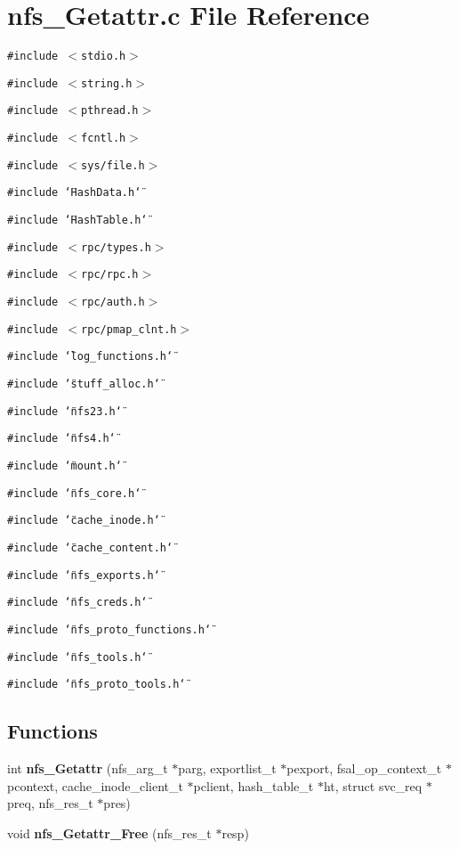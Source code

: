 \section{nfs\_\-Getattr.c File Reference}
\label{nfs__Getattr_8c}
{\tt \#include $<$stdio.h$>$}\par
{\tt \#include $<$string.h$>$}\par
{\tt \#include $<$pthread.h$>$}\par
{\tt \#include $<$fcntl.h$>$}\par
{\tt \#include $<$sys/file.h$>$}\par
{\tt \#include \char`\"{}Hash\-Data.h\char`\"{}}\par
{\tt \#include \char`\"{}Hash\-Table.h\char`\"{}}\par
{\tt \#include $<$rpc/types.h$>$}\par
{\tt \#include $<$rpc/rpc.h$>$}\par
{\tt \#include $<$rpc/auth.h$>$}\par
{\tt \#include $<$rpc/pmap\_\-clnt.h$>$}\par
{\tt \#include \char`\"{}log\_\-functions.h\char`\"{}}\par
{\tt \#include \char`\"{}stuff\_\-alloc.h\char`\"{}}\par
{\tt \#include \char`\"{}nfs23.h\char`\"{}}\par
{\tt \#include \char`\"{}nfs4.h\char`\"{}}\par
{\tt \#include \char`\"{}mount.h\char`\"{}}\par
{\tt \#include \char`\"{}nfs\_\-core.h\char`\"{}}\par
{\tt \#include \char`\"{}cache\_\-inode.h\char`\"{}}\par
{\tt \#include \char`\"{}cache\_\-content.h\char`\"{}}\par
{\tt \#include \char`\"{}nfs\_\-exports.h\char`\"{}}\par
{\tt \#include \char`\"{}nfs\_\-creds.h\char`\"{}}\par
{\tt \#include \char`\"{}nfs\_\-proto\_\-functions.h\char`\"{}}\par
{\tt \#include \char`\"{}nfs\_\-tools.h\char`\"{}}\par
{\tt \#include \char`\"{}nfs\_\-proto\_\-tools.h\char`\"{}}\par
\subsection*{Functions}
\begin{CompactItemize}
\item 
int {\bf nfs\_\-Getattr} (nfs\_\-arg\_\-t $\ast$parg, exportlist\_\-t $\ast$pexport, fsal\_\-op\_\-context\_\-t $\ast$pcontext, cache\_\-inode\_\-client\_\-t $\ast$pclient, hash\_\-table\_\-t $\ast$ht, struct svc\_\-req $\ast$preq, nfs\_\-res\_\-t $\ast$pres)
\item 
void {\bf nfs\_\-Getattr\_\-Free} (nfs\_\-res\_\-t $\ast$resp)
\end{CompactItemize}


